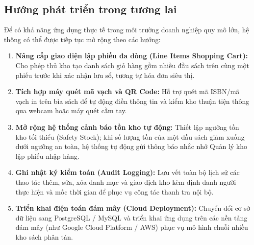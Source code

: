 \documentclass[12pt,a4paper]{article}
\begin{document}
\subsection{Hướng phát triển trong tương lai}
\label{subsec:huong-phat-trien}

Để có khả năng ứng dụng thực tế trong môi trường doanh nghiệp quy mô lớn, hệ thống có thể được tiếp tục mở rộng theo các hướng:
\begin{enumerate}
    \item \textbf{Nâng cấp giao diện lập phiếu đa dòng (Line Items Shopping Cart):} Cho phép thủ kho tạo danh sách giỏ hàng gồm nhiều đầu sách trên cùng một phiếu trước khi xác nhận lưu sổ, tương tự hóa đơn siêu thị.
    \item \textbf{Tích hợp máy quét mã vạch và QR Code:} Hỗ trợ quét mã ISBN/mã vạch in trên bìa sách để tự động điền thông tin và kiểm kho thuận tiện thông qua webcam hoặc máy quét cầm tay.
    \item \textbf{Mở rộng hệ thống cảnh báo tồn kho tự động:} Thiết lập ngưỡng tồn kho tối thiểu (Safety Stock); khi số lượng tồn của một đầu sách giảm xuống dưới ngưỡng an toàn, hệ thống tự động gửi thông báo nhắc nhở Quản lý kho lập phiếu nhập hàng.
    \item \textbf{Ghi nhật ký kiểm toán (Audit Logging):} Lưu vết toàn bộ lịch sử các thao tác thêm, sửa, xóa danh mục và giao dịch kho kèm định danh người thực hiện và mốc thời gian để phục vụ công tác thanh tra nội bộ.
    \item \textbf{Triển khai điện toán đám mây (Cloud Deployment):} Chuyển đổi cơ sở dữ liệu sang PostgreSQL / MySQL và triển khai ứng dụng trên các nền tảng đám mây (như Google Cloud Platform / AWS) phục vụ mô hình chuỗi nhiều kho sách phân tán.
\end{enumerate}
\end{document}
